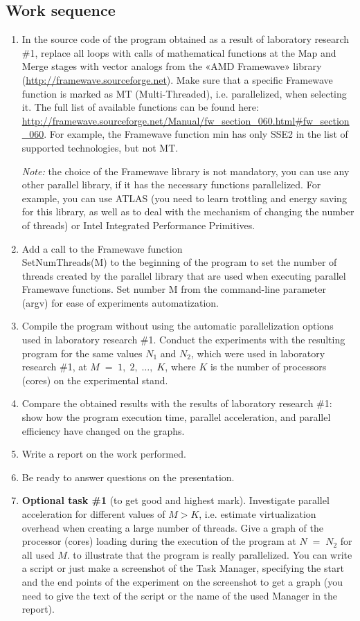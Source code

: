 { %
	\subsection{Work sequence}
	\begin{enumerate}
		\item In the source code of the program obtained as a result of laboratory research \#1, replace all loops with calls of mathematical functions at the Map and Merge stages with vector analogs from the «AMD Framewave» library (\url{http://framewave.sourceforge.net}). Make sure that a specific Framewave function is marked as MT (Multi-Threaded), i.e. parallelized, when selecting it. The full list of available functions can be found here: \url{http://framewave.sourceforge.net/Manual/fw_section_060.html#fw_section_060}. For example, the Framewave function min has only SSE2 in the list of supported technologies, but not MT. 
			\par\textit{Note:} the choice of the Framewave library is not mandatory, you can use any other parallel library, if it has the necessary functions parallelized. For example, you can use ATLAS (you need to learn trottling and energy saving for this library, as well as to deal with the mechanism of changing the number of threads) or Intel Integrated Performance Primitives.
		\item Add a call to the Framewave function \\SetNumThreads(M) to the beginning of the program to set the number of threads created by the parallel library that are used when executing parallel Framewave functions. Set number M from the command-line parameter (argv) for ease of experiments automatization.
		\item Compile the program without using the automatic parallelization options used in laboratory research \#1. Conduct the experiments with the resulting program for the same values $N_1$ and $N_2$, which were used in laboratory research \#1, at $M\;=\;1,\;2,\;…,\;K$, where $K$ is the number of processors (cores) on the experimental stand.
		\item Compare the obtained results with the results of laboratory research \#1: show how the program execution time, parallel acceleration, and parallel efficiency have changed on the graphs.
		\item Write a report on the work performed.
		\item Be ready to answer questions on the presentation.
		\item\textbf{Optional task \#1} (to get good and highest mark). Investigate parallel acceleration for different values of $M > K$, i.e. estimate virtualization overhead when creating a large number of threads. Give a graph of the processor (cores) loading during the execution of the program at $N\;=\;N_2$ for all used $M$. to illustrate that the program is really parallelized. You can write a script or just make a screenshot of the Task Manager, specifying the start and the end points of the experiment on the screenshot to get a graph (you need to give the text of the script or the name of the used Manager in the report).

\end{enumerate}}
